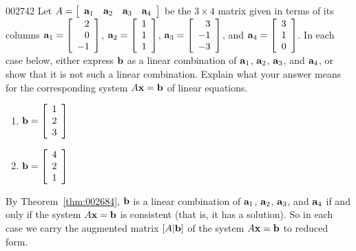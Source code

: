 \begin{example}{}{002742}
Let $A = \left[ \begin{array}{cccc}
\textbf{a}_{1} & \textbf{a}_{2} & \textbf{a}_{3} & \textbf{a}_{4}
\end{array} \right]$ be the $3 \times 4$ matrix given in terms of its columns 
$\textbf{a}_{1} = \left[ \begin{array}{r}
2 \\
0 \\
-1
\end{array} \right]$, $\textbf{a}_{2} = \left[ \begin{array}{r}
1 \\
1 \\
1
\end{array} \right]$, 
$\textbf{a}_{3} = \left[ \begin{array}{r}
3 \\
-1 \\
-3
\end{array} \right]$, and 
$\textbf{a}_{4} = \left[ \begin{array}{r}
3 \\
1 \\
0
\end{array} \right]$.
 In each case below, either express $\textbf{b}$ as a linear combination of $\textbf{a}_{1}$, $\textbf{a}_{2}$, $\textbf{a}_{3}$, and $\textbf{a}_{4}$, or show that it is not such a linear combination. Explain what your answer means for the corresponding system $A\textbf{x} = \textbf{b}$ of linear equations.
\begin{multicols}{2}
\begin{enumerate}[label={\alph*.}]
\item
$\textbf{b} = \left[ \begin{array}{r}
1 \\
2 \\
3
\end{array} \right]
$

\columnbreak
\item 
$\textbf{b} = \left[ \begin{array}{r}
4 \\
2 \\
1
\end{array} \right]$

\end{enumerate}
\end{multicols}

\begin{solution}
  By Theorem~\ref{thm:002684}, $\textbf{b}$ is a linear combination of $\textbf{a}_{1}$, $\textbf{a}_{2}$, $\textbf{a}_{3}$, and $\textbf{a}_{4}$ if and only if the system $A\textbf{x} = \textbf{b}$ is consistent (that is, it has a solution). So in each case we carry the augmented matrix $\left[ A|\textbf{b} \right]$ of the system $A\textbf{x} = \textbf{b}$ to reduced form.


\end{solution}
\end{example}
